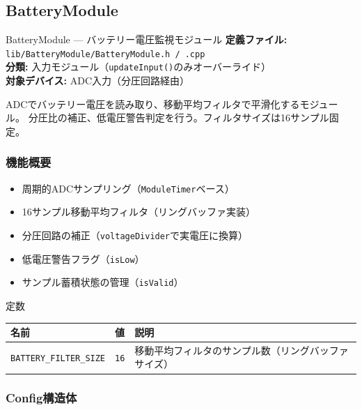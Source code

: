 \subsection{BatteryModule}

\begin{apibox}{BatteryModule --- バッテリー電圧監視モジュール}
\textbf{定義ファイル:} \texttt{lib/BatteryModule/BatteryModule.h / .cpp}\\
\textbf{分類:} 入力モジュール（\texttt{updateInput()}のみオーバーライド）\\
\textbf{対象デバイス:} ADC入力（分圧回路経由）

ADCでバッテリー電圧を読み取り、移動平均フィルタで平滑化するモジュール。
分圧比の補正、低電圧警告判定を行う。フィルタサイズは16サンプル固定。
\end{apibox}

\subsubsection{機能概要}

\begin{itemize}
    \item 周期的ADCサンプリング（\texttt{ModuleTimer}ベース）
    \item 16サンプル移動平均フィルタ（リングバッファ実装）
    \item 分圧回路の補正（\texttt{voltageDivider}で実電圧に換算）
    \item 低電圧警告フラグ（\texttt{isLow}）
    \item サンプル蓄積状態の管理（\texttt{isValid}）
\end{itemize}

\begin{funcblock}{定数}
\begin{tabularx}{\textwidth}{l l X}
\toprule
\textbf{名前} & \textbf{値} & \textbf{説明} \\
\midrule
\texttt{BATTERY\_FILTER\_SIZE} & \texttt{16} & 移動平均フィルタのサンプル数（リングバッファサイズ） \\
\bottomrule
\end{tabularx}
\end{funcblock}

\subsubsection{Config構造体}

